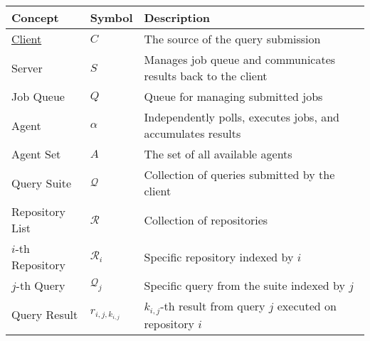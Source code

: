 \documentclass[11pt]{article}
\begin{document}
\begin{center}
    \begin{tabular}{lll}
        Concept                                                                       & Symbol                            & Description                                                         \\[0pt]
        \hline
        \href{vscode://file//Users/hohn/work-gh/mrva/gh-mrva/README.org:39:1}{Client} & \(C\)                             & The source of the query submission                                  \\[0pt]
        Server                                                                        & \(S\)                             & Manages job queue and communicates results back to the client       \\[0pt]
        Job Queue                                                                     & \(Q\)                             & Queue for managing submitted jobs                                   \\[0pt]
        Agent                                                                         & \(\alpha\)                        & Independently polls, executes jobs, and accumulates results         \\[0pt]
        Agent Set                                                                     & \(A\)                             & The set of all available agents                                     \\[0pt]
        Query Suite                                                                   & \(\mathcal{Q}\)                   & Collection of queries submitted by the client                       \\[0pt]
        Repository List                                                               & \(\mathcal{R}\)                   & Collection of repositories                                          \\[0pt]
        \(i\)-th Repository                                                           & \(\mathcal{R}_i\)                 & Specific repository indexed by \(i\)                                \\[0pt]
        \(j\)-th Query                                                                & \(\mathcal{Q}_j\)                 & Specific query from the suite indexed by \(j\)                      \\[0pt]
        Query Result                                                                  & \(r_{i,j,k_{i,j}}\)               & \(k_{i,j}\)-th result from query \(j\) executed on repository \(i\) \\[0pt]

\end{tabular}
\end{center}
\end{document}
